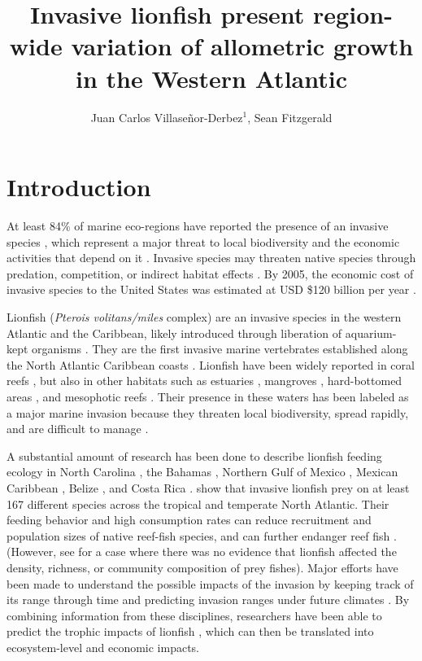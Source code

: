 \documentclass[fleqn,10pt,lineno]{wlpeerj} %
\title{Invasive lionfish present region-wide variation of allometric growth in
the Western Atlantic}
\author[1]{Juan Carlos Villaseñor-Derbez\(^1\), Sean Fitzgerald}
\affil[1]{Bren School of Environmental Sciences and Management, University of
California Santa Barbara, Santa Barbara, California, U.S.}
\begin{document}
\flushbottom
\maketitle
\thispagestyle{empty}

\section*{Introduction}

At least 84\% of marine eco-regions have reported the presence of an
invasive species \citep{molnar_2008}, which represent a major threat to
local biodiversity and the economic activities that depend on it
\citep{bax_2003}. Invasive species may threaten native species through
predation, competition, or indirect habitat effects
\citep{davis_2003, gurevitch_2004}. By 2005, the economic cost of
invasive species to the United States was estimated at USD \$120 billion
per year \citep{pimentel_2005}.

Lionfish (\emph{Pterois volitans/miles} complex) are an invasive species
in the western Atlantic and the Caribbean, likely introduced through
liberation of aquarium-kept organisms \citep{betancurr_2011}. They are
the first invasive marine vertebrates established along the North
Atlantic Caribbean coasts
\citep{schofield_2009,schofield_2010,sabidoitza_2016}. Lionfish have
been widely reported in coral reefs \citep{aguilarperera_2010}, but also
in other habitats such as estuaries \citep{jud_2011}, mangroves
\citep{barbour_2010}, hard-bottomed areas \citep{muoz_2011}, and
mesophotic reefs \citep{andradibrown_2017}. Their presence in these
waters has been labeled as a major marine invasion because they threaten
local biodiversity, spread rapidly, and are difficult to manage
\citep{hixon_2016}.

A substantial amount of research has been done to describe lionfish
feeding ecology in North Carolina \citep{muoz_2011}, the Bahamas
\citep{morris_2009,cote_2013}, Northern Gulf of Mexico
\citep{dahl_2014}, Mexican Caribbean
\citep{valdezmoreno_2012,villaseorderbez_2014}, Belize
\citep{hackerott_2017}, and Costa Rica \citep{sandel_2015}.
\citet{peake_2018} show that invasive lionfish prey on at least 167
different species across the tropical and temperate North Atlantic.
Their feeding behavior and high consumption rates can reduce recruitment
and population sizes of native reef-fish species, and can further
endanger reef fish \citep{albins_2008, green_2012,rocha_2015}. (However,
see \citet{hackerott_2017} for a case where there was no evidence that
lionfish affected the density, richness, or community composition of
prey fishes). Major efforts have been made to understand the possible
impacts of the invasion by keeping track of its range through time
\citep{schofield_2009,schofield_2010} and predicting invasion ranges
under future climates \citep{grieve_2016}. By combining information from
these disciplines, researchers have been able to predict the trophic
impacts of lionfish \citep{ariasgonzalez_2011}, which can then be
translated into ecosystem-level and economic impacts.
\end{document}
